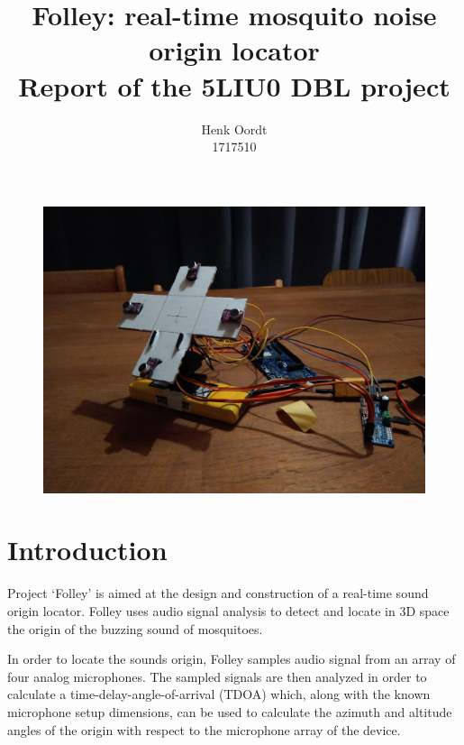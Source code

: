 \documentclass[a4paper]{article}
\begin{document}
\title{{Folley: real-time mosquito noise origin locator} \\\large {Report of the 5LIU0 DBL project}}
\author{{Henk Oordt} \hfill
\\
{1717510} \hfill}

\begin{figure}
    \begin{center}
        \includegraphics[width=\linewidth]{assets/device.jpeg}
    \end{center}
\end{figure}

\maketitle
\newpage

\section{Introduction}
Project `Folley' is aimed at the design and construction of a real-time sound origin locator. Folley uses audio signal analysis to detect and locate in 3D space the origin of the buzzing sound of mosquitoes. 

In order to locate the sounds origin, Folley samples audio signal from an array of four analog microphones. The sampled signals are then analyzed in order to calculate a time-delay-angle-of-arrival (TDOA) \cite{6327613} which, along with the known microphone setup dimensions, can be used to calculate the azimuth and altitude angles of the origin with respect to the microphone array of the device.
\end{document}
